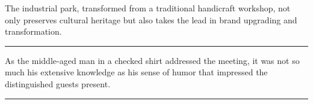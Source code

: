 \documentclass[11pt,a4paper]{article}
\newcommand{\num}[1]{\makebox[1.9em][r]{#1.}\hspace{0.3em}}
\newcommand{\wline}{\noindent\rule{\linewidth}{0.4pt}}
\begin{document}
\begin{minipage}{\linewidth}

\num{39}The industrial park, transformed from a traditional handicraft workshop, not only preserves cultural heritage but also takes the lead in brand upgrading and transformation.

\vspace{0.25em}

\wline

\end{minipage}

\begin{minipage}{\linewidth}

\num{40}As the middle-aged man in a checked shirt addressed the meeting, it was not so much his extensive knowledge as his sense of humor that impressed the distinguished guests present.

\vspace{0.25em}

\wline

\end{minipage}
\end{document}
